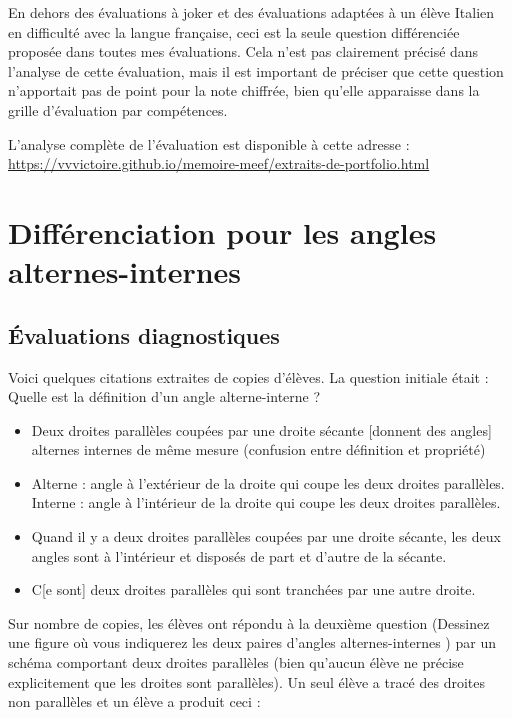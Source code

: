 En dehors des évaluations à joker et des évaluations adaptées à un élève Italien en difficulté avec la langue française, ceci est la seule question différenciée proposée dans toutes mes évaluations. Cela n'est pas clairement précisé dans l'analyse de cette évaluation, mais il est important de préciser que cette question n'apportait pas de point pour la note chiffrée, bien qu'elle apparaisse dans la grille d'évaluation par compétences.

L'analyse complète de l'évaluation est disponible à cette adresse : \url{https://vvvictoire.github.io/memoire-meef/extraits-de-portfolio.html}

\clearpage

\section{Différenciation pour les angles alternes-internes}

\subsection{Évaluations diagnostiques}\label{annexe:angles-prod1}

Voici quelques citations extraites de copies d'élèves. La question initiale était : \og Quelle est la définition d'un angle alterne-interne ? \fg{}
\begin{itemize}
\item Deux droites parallèles coupées par une droite sécante [donnent des angles] alternes internes de même mesure (confusion entre définition et propriété)
\item Alterne : angle à l'extérieur de la droite qui coupe les deux droites parallèles. Interne : angle à l'intérieur de la droite qui coupe les deux droites parallèles. 
\item Quand il y a deux droites parallèles coupées par une droite sécante, les deux angles sont à l'intérieur et disposés de part et d'autre de la sécante.
\item C[e sont] deux droites parallèles qui sont tranchées par une autre droite.
\end{itemize} 

Sur nombre de copies, les élèves ont répondu à la deuxième question (\og Dessinez une figure où vous indiquerez les deux paires d'angles alternes-internes \fg{}) par un schéma comportant deux droites parallèles (bien qu'aucun élève ne précise explicitement que les droites sont parallèles). Un seul élève a tracé des droites non parallèles et un élève a produit ceci :

